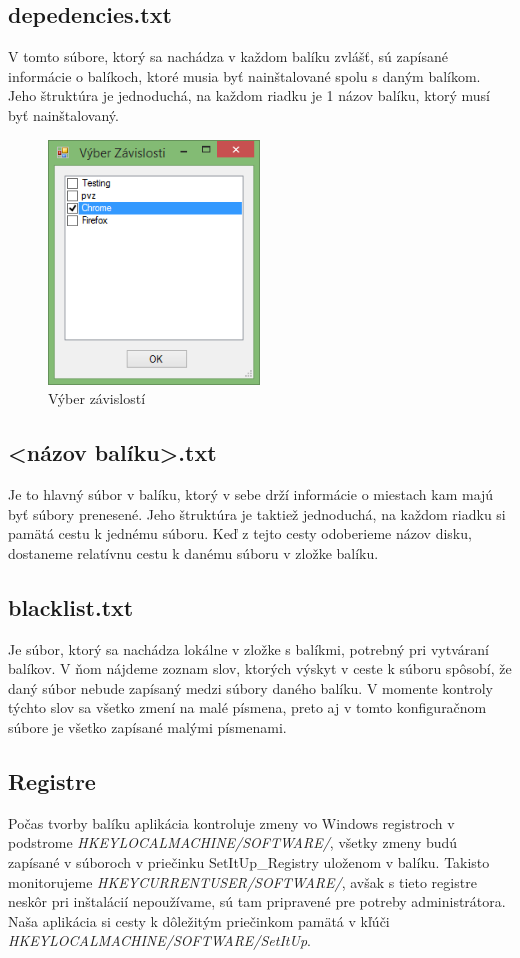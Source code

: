 \subsection{depedencies.txt}
V tomto súbore, ktorý sa nachádza v každom balíku zvlášť, sú zapísané informácie o balíkoch, ktoré musia byť nainštalované spolu s daným balíkom. Jeho štruktúra je jednoduchá, na každom riadku je 1 názov balíku, ktorý musí byť nainštalovaný.
\begin{figure}[h]
    \centering
    \includegraphics[width=0.5\textwidth]{depend}
    \caption{Výber závislostí}
    \label{fig:depend}
\end{figure}

\subsection{\textless názov balíku\textgreater.txt}
Je to hlavný súbor v balíku, ktorý v sebe drží informácie o miestach kam majú byť súbory prenesené. Jeho štruktúra je taktiež jednoduchá, na každom riadku si pamätá cestu k jednému súboru. Keď z tejto cesty odoberieme názov disku, dostaneme relatívnu cestu k danému súboru v zložke balíku.

\subsection{blacklist.txt}
Je súbor, ktorý sa nachádza lokálne v zložke s balíkmi, potrebný pri vytváraní balíkov. V ňom nájdeme zoznam slov, ktorých výskyt v ceste k súboru spôsobí, že daný súbor nebude zapísaný medzi súbory daného balíku. V momente kontroly týchto slov sa všetko zmení na malé písmena, preto aj v tomto konfiguračnom súbore je všetko zapísané malými písmenami.

\subsection{Registre}
Počas tvorby balíku aplikácia kontroluje zmeny vo Windows registroch v podstrome \textit{HKEY\textunderscore LOCAL\textunderscore MACHINE/SOFTWARE/}, všetky zmeny budú zapísané v súboroch v priečinku SetItUp_Registry uloženom v balíku. Takisto monitorujeme \textit{HKEY\textunderscore CURRENT\textunderscore USER/SOFTWARE/}, avšak s tieto registre neskôr pri inštalácií nepoužívame, sú tam pripravené pre potreby administrátora. Naša aplikácia si cesty k dôležitým priečinkom pamätá v kľúči \textit{HKEY\textunderscore LOCAL\textunderscore MACHINE/SOFTWARE/SetItUp}.

